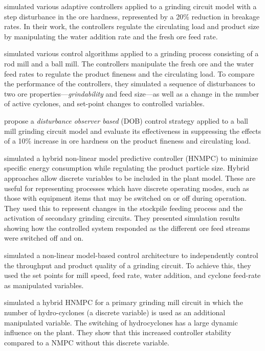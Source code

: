 \cite{najim_adaptive_1995} simulated various adaptive controllers applied to a grinding circuit model with a step disturbance in the ore hardness, represented by a 20\% reduction in breakage rates. In their work, the controllers regulate the circulating load and product size by manipulating the water addition rate and the fresh ore feed rate.

\cite{pomerleau_survey_2000} simulated various control algorithms applied to a grinding process consisting of a rod mill and a ball mill. The controllers manipulate the fresh ore and the water feed rates to regulate the product fineness and the circulating load. To compare the performance of the controllers, they simulated a sequence of disturbances to two ore properties---\textit{grindability} and feed size---as well as a change in the number of active cyclones, and set-point changes to controlled variables.

\cite{chen_disturbance_2009} propose a \textit{disturbance observer based} (DOB) control strategy applied to a ball mill grinding circuit model and evaluate its effectiveness in suppressing the effects of a 10\% increase in ore hardness on the product fineness and circulating load.

\cite{estrada_hybrid_2014} simulated a hybrid non-linear model predictive controller (HNMPC) to minimize specific energy consumption while regulating the product particle size. Hybrid approaches allow discrete variables to be included in the plant model. These are useful for representing processes which have discrete operating modes, such as those with equipment items that may be switched on or off during operation. They used this to represent changes in the stockpile feeding process and the activation of secondary grinding circuits. They presented simulation results showing how the controlled system responded as the different ore feed streams were switched off and on.

\cite{le_roux_throughput_2016} simulated a non-linear model-based control architecture to independently control the throughput and product quality of a grinding circuit. To achieve this, they used the set points for mill speed, feed rate, water addition, and cyclone feed-rate as manipulated variables.

\cite{botha_hybrid_2018} simulated a hybrid HNMPC for a primary grinding mill circuit in which the number of hydro-cyclones (a discrete variable) is used as an additional manipulated variable. The switching of hydrocyclones has a large dynamic influence on the plant. They show that this increased controller stability compared to a NMPC without this discrete variable.

